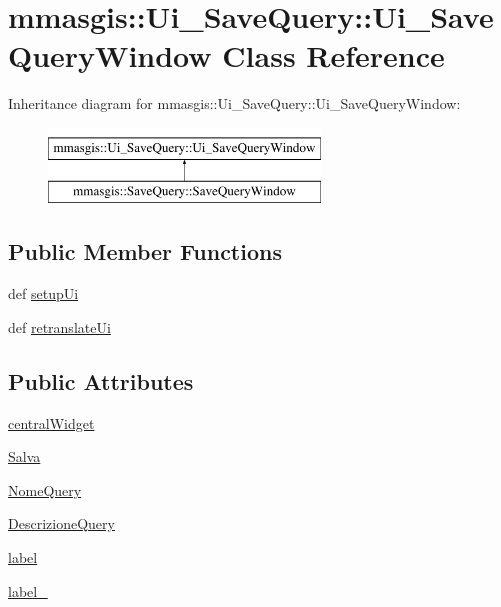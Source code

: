 \hypertarget{classmmasgis_1_1Ui__SaveQuery_1_1Ui__SaveQueryWindow}{
\section{mmasgis::Ui\_\-SaveQuery::Ui\_\-SaveQueryWindow Class Reference}
\label{classmmasgis_1_1Ui__SaveQuery_1_1Ui__SaveQueryWindow}
}
Inheritance diagram for mmasgis::Ui\_\-SaveQuery::Ui\_\-SaveQueryWindow:\begin{figure}[H]
\begin{center}
\leavevmode
\includegraphics[height=2.000000cm]{classmmasgis_1_1Ui__SaveQuery_1_1Ui__SaveQueryWindow}
\end{center}
\end{figure}
\subsection*{Public Member Functions}
\begin{DoxyCompactItemize}
\item 
def \hyperlink{classmmasgis_1_1Ui__SaveQuery_1_1Ui__SaveQueryWindow_adcdce6ca15961c2f028f9a116f27a147}{setupUi}
\item 
def \hyperlink{classmmasgis_1_1Ui__SaveQuery_1_1Ui__SaveQueryWindow_aaf27e58ab7a3c5fc615cb42949b83396}{retranslateUi}
\end{DoxyCompactItemize}
\subsection*{Public Attributes}
\begin{DoxyCompactItemize}
\item 
\hyperlink{classmmasgis_1_1Ui__SaveQuery_1_1Ui__SaveQueryWindow_ad3459fb68d075526c77c2ac410034c70}{centralWidget}
\item 
\hyperlink{classmmasgis_1_1Ui__SaveQuery_1_1Ui__SaveQueryWindow_add6e436fd01caf224e2d898993d0387c}{Salva}
\item 
\hyperlink{classmmasgis_1_1Ui__SaveQuery_1_1Ui__SaveQueryWindow_aa92ac94b7f12887a13346bf3e512c588}{NomeQuery}
\item 
\hyperlink{classmmasgis_1_1Ui__SaveQuery_1_1Ui__SaveQueryWindow_a6d0dde300dcbc4389fe220e18abbc7dc}{DescrizioneQuery}
\item 
\hyperlink{classmmasgis_1_1Ui__SaveQuery_1_1Ui__SaveQueryWindow_ac7746cf4cabed705e39f8c3cd2ad18d7}{label}
\item 
\hyperlink{classmmasgis_1_1Ui__SaveQuery_1_1Ui__SaveQueryWindow_a6d47b746ab1008cb0369a550c9fe5d8e}{label\_}
\end{DoxyCompactItemize}


